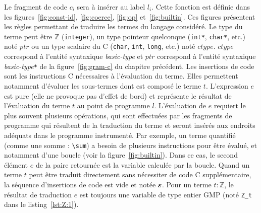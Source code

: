 Le fragment de code $c_i$ sera à insérer au label $l_i$.
Cette fonction est définie dans les figures~\ref{fig:const-id},
\ref{fig:coerce}, \ref{fig:op} et~\ref{fig:builtin}.
Ces figures présentent les règles permettant de traduire les termes du langage
\eacsl considéré.
Le type du terme peut être $\mathbb{Z}$ (\lstinline'integer'), un type pointeur
quelconque (\lstinline'int*', \lstinline'char*', etc.) noté $ptr$ ou un type
scalaire du C (\lstinline'char', \lstinline'int', \lstinline'long', etc.) noté
$ctype$.
$ctype$ correspond à l'entité syntaxique \textit{basic-type} et $ptr$
correspond à l'entité syntaxique \textit{basic-type}\lstinline'*'
de la figure~\ref{fig:gram-c} du chapitre précédent.
Les insertions de code sont les instructions C nécessaires à l'évaluation du
terme.
Elles permettent notamment d'évaluer les sous-termes dont est composé le terme
$t$.
L'expression $e$ est pure (elle ne provoque pas d'effet de bord) et représente
le résultat de l'évaluation du terme $t$ au point de programme $l$.
L'évaluation de $e$ requiert le plus souvent plusieurs opérations, qui sont
effectuées par les fragments de programme qui résultent de la traduction du
terme et seront insérés aux endroits adéquats dans le programme instrumenté.
Par exemple, un terme quantifié (comme une somme : \lstinline'\sum') a besoin de
plusieurs instructions pour être évalué, et notamment d'une boucle (voir la
figure~\ref{fig:builtin}).
Dans ce cas, le second élément $e$ de la paire retournée est la variable
calculée par la boucle.
Quand un terme $t$ peut être traduit directement sans nécessiter de code C
supplémentaire, la séquence d'insertions de code est vide et notée $\varepsilon$.
Pour un terme $t:\mathbb{Z}$, le résultat de traduction $e$ est toujours une
variable de type entier GMP (noté \lstinline'Z_t' dans le
listing~\ref{lst:Z:1}).



